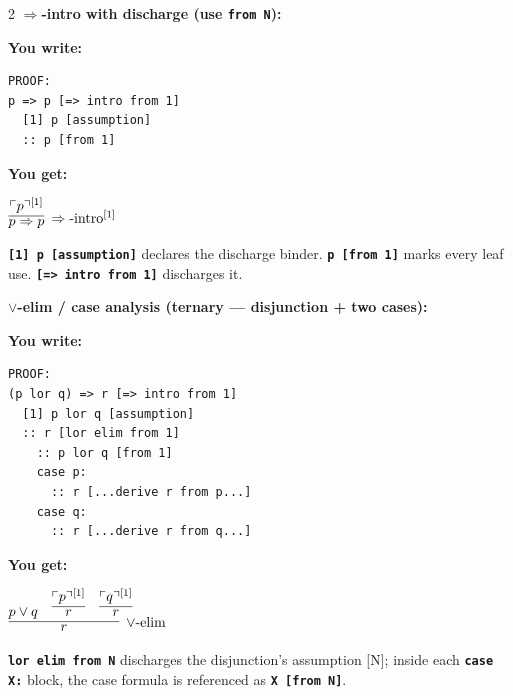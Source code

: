 \documentclass[10pt,landscape,a4paper]{article}
\newcommand{\kw}[1]{\texttt{\bfseries #1}}
\newenvironment{exwrite}%
  {\par\nobreak\noindent\scriptsize\textbf{You write:}\par\nobreak\vspace{0pt}\scriptsize}%
  {\vspace{1pt}\nobreak}
\newenvironment{exget}%
  {\par\nobreak\noindent\scriptsize\textbf{You get:}\par\nobreak\vspace{0pt}\small}%
  {\par\vspace{3pt}}
\begin{document}
\begin{multicols}{2}
\textbf{$\Rightarrow$-intro with discharge (use \kw{from N}):}

\begin{exwrite}%
\begin{verbatim}
PROOF:
p => p [=> intro from 1]
  [1] p [assumption]
  :: p [from 1]
\end{verbatim}
\end{exwrite}
\begin{exget}%
\begin{center}
$\infer[\Rightarrow\textrm{-intro}^{[1]}]{p \Rightarrow p}{\ulcorner p \urcorner^{[1]}}$
\end{center}
\end{exget}

{\scriptsize \kw{[1] p [assumption]} declares the discharge binder.
\kw{p [from 1]} marks every leaf use. \kw{[=> intro from 1]} discharges it.}

\textbf{$\lor$-elim / case analysis (ternary --- disjunction + two cases):}

\begin{exwrite}%
\begin{verbatim}
PROOF:
(p lor q) => r [=> intro from 1]
  [1] p lor q [assumption]
  :: r [lor elim from 1]
    :: p lor q [from 1]
    case p:
      :: r [...derive r from p...]
    case q:
      :: r [...derive r from q...]
\end{verbatim}
\end{exwrite}
\begin{exget}%
\begin{center}
$\infer[\lor\textrm{-elim}]{r}{p \lor q & \infer{r}{\ulcorner p \urcorner^{[1]}} & \infer{r}{\ulcorner q \urcorner^{[1]}}}$
\end{center}
\end{exget}

{\scriptsize \kw{lor elim from N} discharges the disjunction's assumption [N];
inside each \kw{case X:} block, the case formula is referenced as \kw{X [from N]}.}

\end{multicols}

\newpage
\end{document}

